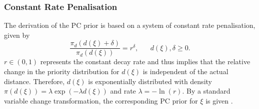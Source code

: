 \subsubsection*{Constant Rate Penalisation}
The derivation of the PC prior is based on a system of constant rate penalisation, given by
\begin{equation}
    \frac{\pi_d\left(d\left(\xi\right)+\delta\right)}{\pi_d\left(d\left(\xi\right)\right)}=r^{\delta}, \hspace{20pt} d\left(\xi\right),\delta\geq0.
\end{equation}
$r\in\left(0,1\right)$ represents the constant decay rate and thus implies that the relative change in the priority distribution for $d\left(\xi\right)$ is independent of the actual distance. Therefore, $d\left(\xi\right)$ is exponentially distributed with density $\pi\left(d\left(\xi\right)\right)=\lambda\exp\left(-\lambda d\left(\xi\right)\right)$ and rate $\lambda = -\ln\left(r\right)$. By a standard variable change transformation, the corresponding PC prior for $\xi$ is given \autocite[][]{martins2014penalising}.
